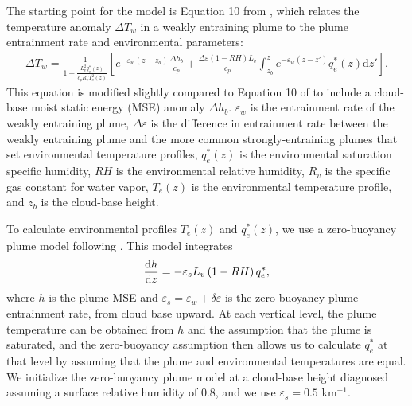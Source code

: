 \documentclass[twocol]{ametsoc}
\begin{document}
The starting point for the model is Equation 10 from \citet{Singh2015IncreasesEquilibrium}, which relates the temperature anomaly $\Delta T_w$ in a weakly entraining plume to the plume entrainment rate and environmental parameters:
\begin{equation}
\begin{split}
    \Delta T_w = \frac{1}{1 + \frac{L_v^2 q^*_e(z)}{c_p R_v T_e^2(z)}} \left [ e^{-\varepsilon_w \left ( z - z_b \right )} \frac{\Delta h_b}{c_p} + \frac{\Delta \varepsilon \left(1 - RH
    \right) L_v}{c_p}\int_{z_b}^{z} e^{-\varepsilon_w (z - z')} q^*_e(z) \mathrm{d}z' \right ].
\end{split}
\end{equation}
This equation is modified slightly compared to Equation 10 of \citet{Singh2015IncreasesEquilibrium} to include a cloud-base moist static energy (MSE) anomaly $\Delta h_b$. $\varepsilon_w$ is the entrainment rate of the weakly entraining plume, $\Delta \varepsilon$ is the difference in entrainment rate between the weakly entraining plume and the more common strongly-entraining plumes that set environmental temperature profiles, $q^*_e(z)$ is the environmental saturation specific humidity, $RH$ is the environmental relative humidity, $R_v$ is the specific gas constant for water vapor, $T_e(z)$ is the environmental temperature profile, and $z_b$ is the cloud-base height. 

To calculate environmental profiles $T_e(z)$ and $q^*_e(z)$, we use a zero-buoyancy plume model following \citet{Singh2013InfluenceEquilibrium}. This model integrates
\begin{equation*}
    \frac{{\rm d}h}{{\rm d}z} = -\varepsilon_s L_v \left(1 - RH\right) q^*_e,
\end{equation*}
where $h$ is the plume MSE and $\varepsilon_s = \varepsilon_w + \delta \varepsilon$ is the zero-buoyancy plume entrainment rate, from cloud base upward. At each vertical level, the plume temperature can be obtained from $h$ and the assumption that the plume is saturated, and the zero-buoyancy assumption then allows us to calculate $q^*_e$ at that level by assuming that the plume and environmental temperatures are equal. We initialize the zero-buoyancy plume model at a cloud-base height diagnosed assuming a surface relative humidity of 0.8, and we use $\varepsilon_s = 0.5$ km$^{-1}$.
\end{document}
